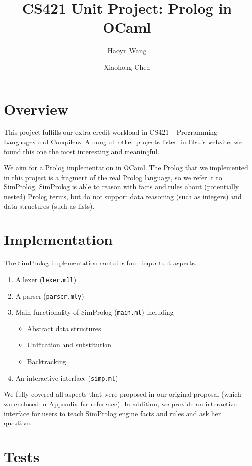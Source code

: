\documentclass{article}
\title{CS421 Unit Project: Prolog in OCaml}
\author{Haoyu Wang  \and Xiaohong Chen}
\begin{document}
\maketitle

\section{Overview}

This project fulfills our extra-credit workload in CS421 -- Programming Languages and Compilers. Among all other projects listed in Elsa's website, we found this one the most interesting and meaningful.

We aim for a Prolog implementation in OCaml. The Prolog that we implemented in this project is a fragment of the real Prolog language, so we refer it to SimProlog. SimProlog is able to reason with facts and rules about (potentially nested) Prolog terms, but do not support data reasoning (such as integers) and data structures (such as lists). 

\section{Implementation}

The SimProlog implementation contains four important aspects.
\begin{enumerate}
	\item A lexer ({\tt lexer.mll})
	\item A parser ({\tt parser.mly})
	\item Main functionality of SimProlog ({\tt main.ml}) including
	\begin{itemize}
		\item Abstract data structures
		\item Unification and substitution
		\item Backtracking
	\end{itemize}
	\item An interactive interface ({\tt simp.ml})
\end{enumerate}

We fully covered all aspects that were proposed in our original proposal (which we enclosed in Appendix for reference). In addition, we provide an interactive interface for users to teach SimProlog engine facts and rules and ask her questions.

\section{Tests}
\end{document}
